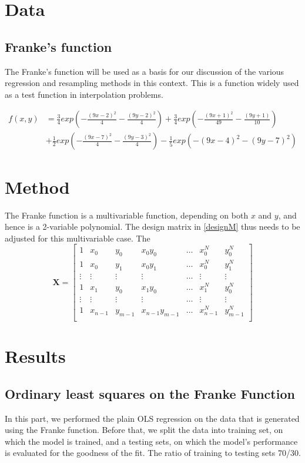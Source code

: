 \documentclass{article}
\begin{document}
\section{Data}
\subsection{Franke's function}
The Franke's function will be used as a basis for our discussion of the various regression and resampling methods in this context. This is a function  widely used as a test function in interpolation problems.

\begin{align*}
f(x,y) &= \frac{3}{4}exp\left(-\frac{(9x-2)^2}{4} - \frac{(9y-2)^2}{4}\right)+\frac{3}{4}exp\left(-\frac{(9x+1)^2}{49} - \frac{(9y+1)}{10}\right)\\
&+ \frac{1}{2}exp\left(-\frac{(9x-7)^2}{4} - \frac{(9y-3)^2}{4}\right)-\frac{1}{5}exp\left(-(9x-4)^2 - (9y-7)^2\right)
\end{align*}
\section{Method}
The Franke function is a multivariable function, depending on both $x$ and $y$, and hence is a 2-variable polynomial. The design matrix in \ref{designM} thus needs to be adjusted for this multivariable case. The 
$$\textbf{X} = \begin{bmatrix}
1 & x_{0} & y_{0} & x_{0}y_{0} & \dots & x_{0}^{N} & y_{0}^{N}     \\
1 & x_{0} & y_{1} & x_{0}y_{1} & \dots & x_{0}^{N} & y_{1}^{N}  \\
\vdots & \vdots & \vdots & \vdots & \dots & \vdots & \vdots \\
1 & x_{1} & y_{0} & x_{1}y_{0} & \dots & x_{1}^{N} & y_{0}^{N} \\
\vdots & \vdots & \vdots & \vdots & \dots & \vdots & \vdots \\
1 & x_{n-1} & y_{m-1} & x_{n-1}y_{m-1} & \dots & x_{n-1}^{N} & y_{m-1}^{N} \\
\end{bmatrix}$$
\section{Results}
\subsection{Ordinary least squares on the Franke Function}
In this part, we performed the plain OLS regression on the data that is generated using the Franke function. Before that, we split the data into training set, on which the model is trained, and a testing sets, on which the model’s performance is evaluated for the goodness of the fit. The ratio of training to testing sets 70/30.
\end{document}
